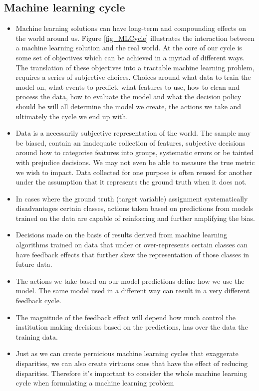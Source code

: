 \subsection*{Machine learning cycle}

\begin{itemize}[leftmargin=*]
%
\item Machine learning solutions can have long-term and compounding effects on the world around us. Figure \ref{fig_MLCycle} illustrates the interaction between a machine learning solution and the real world. At the core of our cycle is some set of objectives which can be achieved in a myriad of different ways. The translation of these objectives into a tractable machine learning problem, requires a series of subjective choices. Choices around what data to train the model on, what events to predict, what features to use, how to clean and process the data, how to evaluate the model and what the decision policy should be will all determine the model we create, the actions we take and ultimately the cycle we end up with.
%
\item Data is a necessarily subjective representation of the world. The sample may be biased, contain an inadequate collection of features, subjective decisions around how to categorise features into groups, systematic errors or be tainted with prejudice decisions. We may not even be able to measure the true metric we wish to impact. Data collected for one purpose is often reused for another under the assumption that it represents the ground truth when it does not.
%
\item In cases where the ground truth (target variable) assignment systematically disadvantages certain classes, actions taken based on predictions from models trained on the data are capable of reinforcing and further amplifying the bias.
%
\item Decisions made on the basis of results derived from machine learning algorithms trained on data that under or over-represents certain classes can have feedback effects that further skew the representation of those classes in future data.
%
\item The actions we take based on our model predictions define how we use the model. The same model used in a different way can result in a very different feedback cycle.
%
\item The magnitude of the feedback effect will depend how much control the institution making decisions based on the predictions, has over the data the training data.
%
\item Just as we can create pernicious machine learning cycles that exaggerate disparities, we can also create virtuous ones that have the effect of reducing disparities. Therefore it's important to consider the whole machine learning cycle when formulating a machine learning problem
%
\end{itemize}

